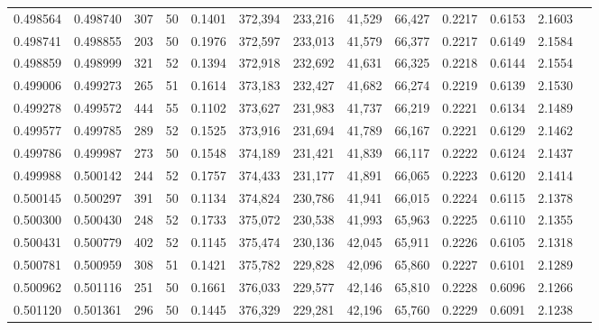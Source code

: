 \begin{tabular}{rrrrrrrrrrrrr}
0.498564 & 0.498740 &   307 &  50 &                                     0.1401 & 372,394 & 233,216 &  41,529 &  66,427 & 0.2217 & 0.6153 & 2.1603 \\
0.498741 & 0.498855 &   203 &  50 &                                     0.1976 & 372,597 & 233,013 &  41,579 &  66,377 & 0.2217 & 0.6149 & 2.1584 \\
0.498859 & 0.498999 &   321 &  52 &                                     0.1394 & 372,918 & 232,692 &  41,631 &  66,325 & 0.2218 & 0.6144 & 2.1554 \\
0.499006 & 0.499273 &   265 &  51 &                                     0.1614 & 373,183 & 232,427 &  41,682 &  66,274 & 0.2219 & 0.6139 & 2.1530 \\
0.499278 & 0.499572 &   444 &  55 &                                     0.1102 & 373,627 & 231,983 &  41,737 &  66,219 & 0.2221 & 0.6134 & 2.1489 \\
0.499577 & 0.499785 &   289 &  52 &                                     0.1525 & 373,916 & 231,694 &  41,789 &  66,167 & 0.2221 & 0.6129 & 2.1462 \\
0.499786 & 0.499987 &   273 &  50 &                                     0.1548 & 374,189 & 231,421 &  41,839 &  66,117 & 0.2222 & 0.6124 & 2.1437 \\
0.499988 & 0.500142 &   244 &  52 &                                     0.1757 & 374,433 & 231,177 &  41,891 &  66,065 & 0.2223 & 0.6120 & 2.1414 \\
0.500145 & 0.500297 &   391 &  50 &                                     0.1134 & 374,824 & 230,786 &  41,941 &  66,015 & 0.2224 & 0.6115 & 2.1378 \\
0.500300 & 0.500430 &   248 &  52 &                                     0.1733 & 375,072 & 230,538 &  41,993 &  65,963 & 0.2225 & 0.6110 & 2.1355 \\
0.500431 & 0.500779 &   402 &  52 &                                     0.1145 & 375,474 & 230,136 &  42,045 &  65,911 & 0.2226 & 0.6105 & 2.1318 \\
0.500781 & 0.500959 &   308 &  51 &                                     0.1421 & 375,782 & 229,828 &  42,096 &  65,860 & 0.2227 & 0.6101 & 2.1289 \\
0.500962 & 0.501116 &   251 &  50 &                                     0.1661 & 376,033 & 229,577 &  42,146 &  65,810 & 0.2228 & 0.6096 & 2.1266 \\
0.501120 & 0.501361 &   296 &  50 &                                     0.1445 & 376,329 & 229,281 &  42,196 &  65,760 & 0.2229 & 0.6091 & 2.1238 \\

\end{tabular}
